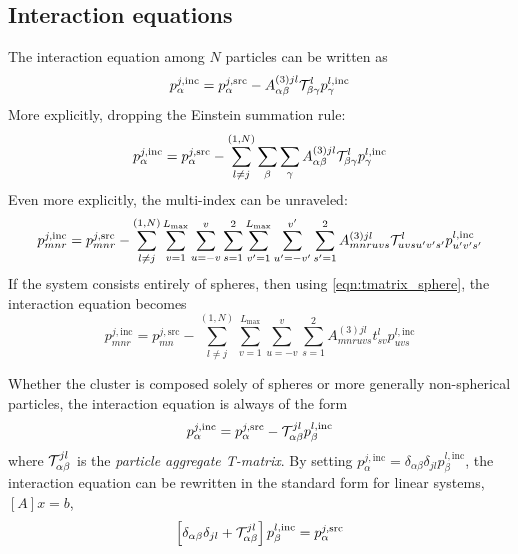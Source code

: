 \documentclass[11pt]{article}
\begin{document}
\subsection{Interaction equations}
The interaction equation among $N$ particles can be written as
\begin{equation}
    p_{\alpha}^{j,\text{inc}} = 
    p_{\alpha}^{j,\text{src}} -
    A_{\alpha \beta}^{(3)jl}
    \mathcal{T}_{\beta \gamma}^l
    p_{\gamma}^{l,\text{inc}}
\label{eqn:particle_interactions}
\end{equation}
More explicitly, dropping the Einstein summation rule:
\begin{equation}
    p_{\alpha}^{j,\text{inc}} = 
    p_{\alpha}^{j,\text{src}} -
    \sum_{l \neq j}^{(1,N)}
    \sum_{\beta} \sum_{\gamma}
    A_{\alpha \beta}^{(3)jl}
    \mathcal{T}_{\beta \gamma}^l
    p_{\gamma}^{l,\text{inc}}
\end{equation}
Even more explicitly, the multi-index can be unraveled:
\begin{equation}
    p_{mnr}^{j,\text{inc}} = 
    p_{mnr}^{j,\text{src}} -
    \sum_{l \neq j}^{(1,N)}\sum_{v=1}^{L_\text{max}} \sum_{u=-v}^{v}
    \sum_{s=1}^{2}
    \sum_{v^\prime=1}^{L_\text{max}} \sum_{u^\prime=-v^\prime}^{v^\prime}
    \sum_{s^\prime=1}^{2}
    A_{mnruvs}^{(3)jl}
    \mathcal{T}_{uvsu^\prime v^\prime s^\prime}^l
    p_{u^\prime v^\prime s^\prime}^{l,\text{inc}}
\end{equation}
If the system consists entirely of spheres, then using \cref{eqn:tmatrix_sphere}, the interaction equation becomes
\begin{equation}
    p_{mnr}^{j,\text{inc}} = p_{mn}^{j,\text{src}}  -  \sum_{l \neq j}^{(1,N)}\sum_{v=1}^{L_\text{max}} \sum_{u=-v}^{v} \sum_{s=1}^2
    A_{mnruvs}^{(3)jl} t_{sv}^l p_{uvs}^{l,\text{inc}}
    \label{eqn:sphere_interations}
\end{equation}

Whether the cluster is composed solely of spheres or more generally non-spherical particles, the interaction equation is always of the form
\begin{equation}
    p_{\alpha}^{j,\text{inc}} = 
    p_{\alpha}^{j,\text{src}} -
    \mathcal{T}_{\alpha \beta}^{jl}
    p_{\beta}^{l,\text{inc}}
\end{equation}
where $\mathcal{T}_{\alpha \beta}^{jl}$ is the \emph{particle aggregate T-matrix}.
By setting $p_\alpha^{j,\text{inc}} = \delta_{\alpha\beta} \delta_{jl} p_\beta^{l,\text{inc}}$, the interaction equation can be rewritten in the standard form for linear systems, $[A]x=b$,
\begin{equation}
    \left[ \delta_{\alpha\beta} \delta_{jl}
    + \mathcal{T}_{\alpha \beta}^{jl} \right]
    p_{\beta}^{l,\text{inc}} =
    p_{\alpha}^{j,\text{src}}
\end{equation}
\end{document}

